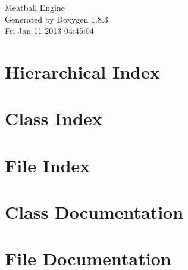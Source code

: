 \documentclass{book}
\begin{document}
\hypersetup{pageanchor=false,citecolor=blue}
\begin{titlepage}
\vspace*{7cm}
\begin{center}
{\Large Meatball Engine }\\
\vspace*{1cm}
{\large Generated by Doxygen 1.8.3}\\
\vspace*{0.5cm}
{\small Fri Jan 11 2013 04:45:04}\\
\end{center}
\end{titlepage}
\clearemptydoublepage
{}
\tableofcontents
\clearemptydoublepage
{}
\hypersetup{pageanchor=true,citecolor=blue}
\chapter{Hierarchical Index}

\chapter{Class Index}

\chapter{File Index}

\chapter{Class Documentation}












\chapter{File Documentation}
























\printindex
\end{document}
